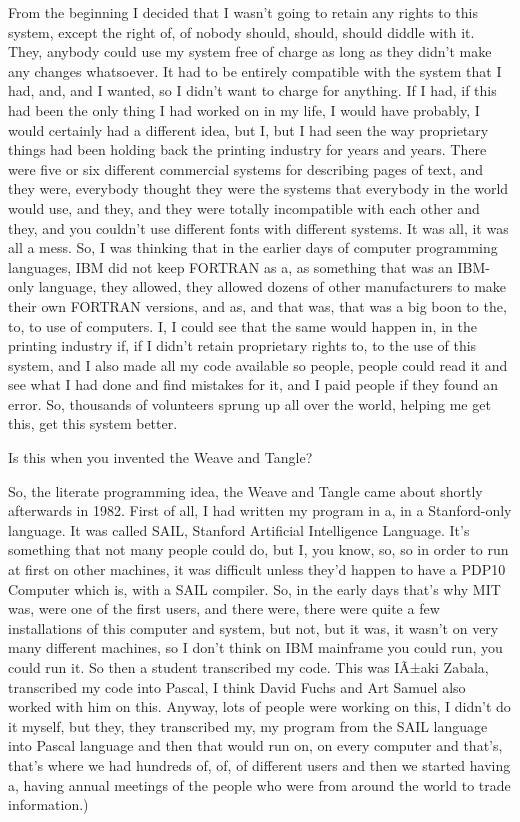 \documentclass[]{article}
\begin{document}
From the beginning I decided that I wasn't going to retain any rights to
this system, except the right of, of nobody should, should, should
diddle with it. They, anybody could use my system free of charge as long
as they didn't make any changes whatsoever. It had to be entirely
compatible with the system that I had, and, and I wanted, so I didn't
want to charge for anything. If I had, if this had been the only thing I
had worked on in my life, I would have probably, I would certainly had a
different idea, but I, but I had seen the way proprietary things had
been holding back the printing industry for years and years. There were
five or six different commercial systems for describing pages of text,
and they were, everybody thought they were the systems that everybody in
the world would use, and they, and they were totally incompatible with
each other and they, and you couldn't use different fonts with different
systems. It was all, it was all a mess. So, I was thinking that in the
earlier days of computer programming languages, IBM did not keep FORTRAN
as a, as something that was an IBM-only language, they allowed, they
allowed dozens of other manufacturers to make their own FORTRAN
versions, and as, and that was, that was a big boon to the, to, to use
of computers. I, I could see that the same would happen in, in the
printing industry if, if I didn't retain proprietary rights to, to the
use of this system, and I also made all my code available so people,
people could read it and see what I had done and find mistakes for it,
and I paid people if they found an error. So, thousands of volunteers
sprung up all over the world, helping me get this, get this system
better.

Is this when you invented the Weave and Tangle?

So, the literate programming idea, the Weave and Tangle came about
shortly afterwards in 1982. First of all, I had written my program in a,
in a Stanford-only language. It was called SAIL, Stanford Artificial
Intelligence Language. It's something that not many people could do, but
I, you know, so, so in order to run at first on other machines, it was
difficult unless they'd happen to have a PDP10 Computer which is, with a
SAIL compiler. So, in the early days that's why MIT was, were one of the
first users, and there were, there were quite a few installations of
this computer and system, but not, but it was, it wasn't on very many
different machines, so I don't think on IBM mainframe you could run, you
could run it. So then a student transcribed my code. This was IÃ±aki
Zabala, transcribed my code into Pascal, I think David Fuchs and Art
Samuel also worked with him on this. Anyway, lots of people were working
on this, I didn't do it myself, but they, they transcribed my, my
program from the SAIL language into Pascal language and then that would
run on, on every computer and that's, that's where we had hundreds of,
of, of different users and then we started having a, having annual
meetings of the people who were from around the world to trade
information.)
\end{document}

